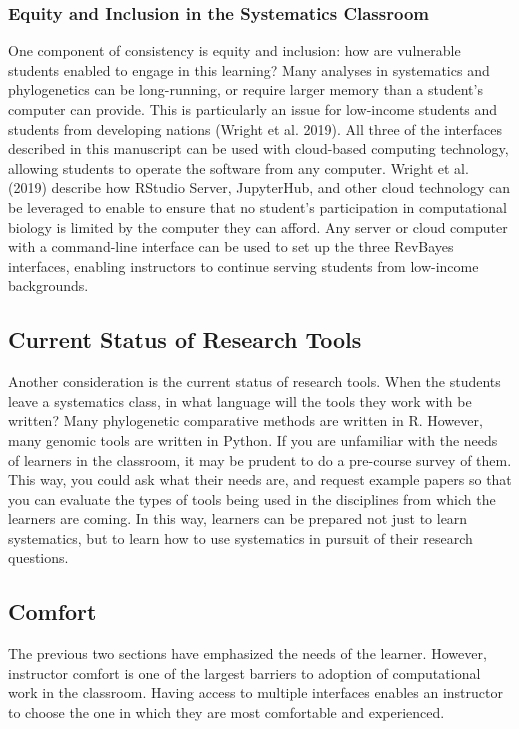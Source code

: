 \documentclass{article}
\begin{document}
\subsubsection{Equity and Inclusion in the Systematics Classroom}

One component of consistency is equity and inclusion: how are vulnerable students enabled to engage in this learning? 
Many analyses in systematics and phylogenetics can be long-running, or require larger memory than a student's computer can provide.
This is particularly an issue for low-income students and students from developing nations (Wright et al. 2019).
All three of the interfaces described in this manuscript can be used with cloud-based computing technology, allowing students to operate the software from any computer.
Wright et al. (2019) describe how RStudio Server, JupyterHub, and other cloud technology can be leveraged to enable to ensure that no student's participation in computational biology is limited by the computer they can afford.
Any server or cloud computer with a command-line interface can be used to set up the three RevBayes interfaces, enabling instructors to continue serving students from low-income backgrounds.

\subsection{Current Status of Research Tools}

Another consideration is the current status of research tools.
When the students leave a systematics class, in what language will the tools they work with be written? 
Many phylogenetic comparative methods are written in R. 
However, many genomic tools are written in Python. 
If you are unfamiliar with the needs of learners in the classroom, it may be prudent to do a pre-course survey of them. 
This way, you could ask what their needs are, and request example papers so that you can evaluate the types of tools being used in the disciplines from which the learners are coming.
In this way, learners can be prepared not just to learn systematics, but to learn how to use systematics in pursuit of their research questions. 


\subsection{Comfort}

The previous two sections have emphasized the needs of the learner. 
However, instructor comfort is one of the largest barriers to adoption of computational work in the classroom.
Having access to multiple interfaces enables an instructor to choose the one in which they are most comfortable and experienced.
\end{document}
